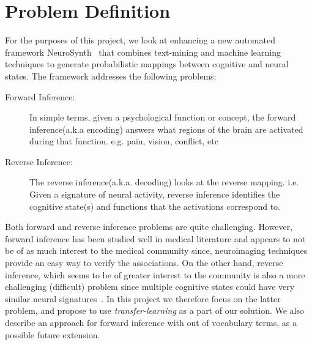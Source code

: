 \documentclass[11pt]{article}
\begin{document}
\section{Problem Definition}
For the purposes of this project, we look at enhancing a new automated framework NeuroSynth~\cite{yarkoni2011large}  that combines text-mining and machine learning techniques to generate probabilistic mappings between cognitive and neural states. The framework addresses the following problems:
\begin{description}
\item[Forward Inference: ] In simple terms, given a psychological function or concept, the forward inference(a.k.a encoding) answers what regions of the brain are activated during that function. e.g. pain, vision, conflict, etc
\item[Reverse Inference: ] The reverse inference(a.k.a. decoding) looks at the reverse mapping. i.e. Given a signature of neural activity, reverse inference identifies the cognitive state(s) and functions that the activations correspond to.
\end{description}
Both forward and reverse inference problems are quite challenging. However, forward inference has been studied well in medical literature and appears to not be of as much interest to the medical community since, neuroimaging techniques provide an easy way to verify the associations. On the other hand, reverse inference, which seems to be of greater interest to the community is also a more challenging (difficult) problem since multiple cognitive states could have very similar neural signatures~\cite{yarkoni2011large}. In this project we therefore focus on the latter problem,  and propose to use \emph{transfer-learning} as a part of our solution.  We also describe an approach for forward inference with out of vocabulary terms, as a possible future extension.
\end{document}

